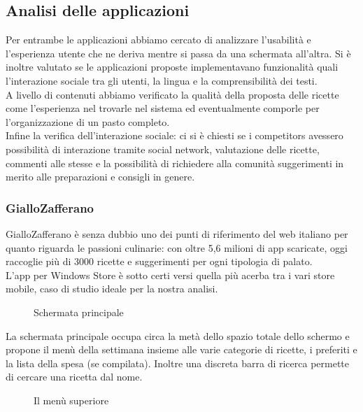 \documentclass[12pt,a4paper,openright,twoside]{article}
\begin{document}
\subsection{Analisi delle applicazioni}
Per entrambe le applicazioni abbiamo cercato di analizzare l'usabilità e l’esperienza
utente che ne deriva mentre si passa da una schermata all’altra. Si è inoltre valutato se le
applicazioni proposte implementavano funzionalità quali l’interazione sociale tra gli utenti, la
lingua e la comprensibilità dei testi.\\
A livello di contenuti abbiamo verificato la qualità della proposta delle ricette come l’esperienza nel trovarle nel sistema ed eventualmente comporle per l'organizzazione di un pasto completo.\\
Infine la verifica dell'interazione sociale: ci si è chiesti se i competitors avessero
possibilità di interazione tramite social network, valutazione delle ricette, commenti alle stesse e
la possibilità di richiedere alla comunità suggerimenti in merito alle preparazioni e consigli in
genere.
\subsubsection{GialloZafferano}

GialloZafferano è senza dubbio uno dei punti di riferimento del web italiano per quanto riguarda le passioni culinarie: con oltre 5,6 milioni di app scaricate, oggi raccoglie più di 3000 ricette e suggerimenti per ogni tipologia di palato.\\
L'app per Windows Store è sotto certi versi quella più acerba tra i vari store mobile, caso di studio ideale per la nostra analisi.\\

\begin{figure}[h]
  \caption{Schermata principale}
  \label{fig:key}
\end{figure}

La schermata principale occupa circa la metà dello spazio totale dello schermo e propone il menù della settimana insieme alle varie categorie di ricette, i preferiti e la lista della spesa (se compilata). Inoltre una discreta barra di ricerca permette di cercare una ricetta dal nome.

\begin{figure}[h]
  \caption{Il menù superiore}
  \label{fig:key}
\end{figure}
\end{document}
